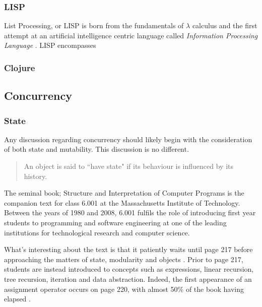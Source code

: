 \documentclass[12pt,a4paper]{article}
\begin{document}
\subsubsection{LISP}


List Processing, or LISP is born from the fundamentals of $\lambda$ calculus and the first attempt at an artificial intelligence centric language called \emph{Information Processing Language} \cite{lispPart1,historyOfLisp}. LISP encompasses     



\cite{historyOfLisp}

\cite{lispPart1}




\subsubsection{Clojure}

\subsection{Concurrency}

\subsubsection{State}

Any discussion regarding concurrency should likely begin with the consideration of both state and mutability. This discussion is no different.

\begin{quote}
    An object is said to ``have state" if its behaviour is influenced by its history. \cite{structureAndInterpretation}
\end{quote}

The seminal book; Structure and Interpretation of Computer Programs \cite{structureAndInterpretation} is the companion text for class 6.001 at the Massachusetts Institute of Technology. Between the years of 1980 and 2008, 6.001 fulfils the role of introducing first year students to programming and software engineering at one of the leading institutions for technological research and computer science.

What's interesting about the text is that it patiently waits until page 217 before approaching the matters of state, modularity and objects \cite{structureAndInterpretation}. Prior to page 217, students are instead introduced to concepts such as expressions, linear recursion, tree recursion, iteration and data abstraction. Indeed, the first appearance of an assignment operator occurs on page 220, with almost 50\% of the book having elapsed \cite{structureAndInterpretation}.
\end{document}
